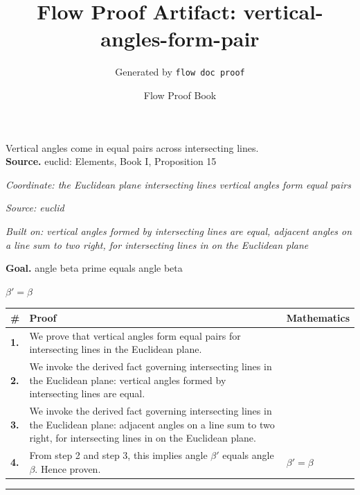 \documentclass[11pt]{article}
\title{Flow Proof Artifact: vertical-angles-form-pair}
\author{Generated by \texttt{flow doc proof}}
\date{Flow Proof Book}
\theoremstyle{definition}
\begin{document}
\maketitle
Vertical angles come in equal pairs across intersecting lines.\\[0.5em]
\textbf{Source.} euclid: Elements, Book I, Proposition 15\\[0.5em]
\bigskip
{}\par
\smallskip\noindent\textit{Coordinate: the Euclidean plane \cdot intersecting lines \cdot vertical angles form equal pairs}\par
\smallskip\noindent\textit{Source: euclid}\par
\smallskip\noindent\textit{Built on: vertical angles formed by intersecting lines are equal, adjacent angles on a line sum to two right, for intersecting lines in on the Euclidean plane}\par
\medskip
\noindent\textbf{Goal.} angle beta prime equals angle beta\par
\noindent$\displaystyle \beta' = \beta$\par
\medskip
\noindent
\begin{tabular}{@{} >{\raggedright\arraybackslash}p{} >{\raggedright\arraybackslash}p{} >{\raggedleft\arraybackslash}p{} @{}}
\textbf{\#} & \textbf{Proof} & \textbf{Mathematics} \\
\midrule
\textbf{1.} & We prove that vertical angles form equal pairs for intersecting lines in the Euclidean plane. & \\[0.45em]
\textbf{2.} & We invoke the derived fact governing intersecting lines in the Euclidean plane: vertical angles formed by intersecting lines are equal. & \\[0.45em]
\textbf{3.} & We invoke the derived fact governing intersecting lines in the Euclidean plane: adjacent angles on a line sum to two right, for intersecting lines in on the Euclidean plane. & \\[0.45em]
\textbf{4.} & From step 2 and step 3, this implies angle $\beta$$'$ equals angle $\beta$. Hence proven. & $\displaystyle \beta' = \beta$ \\[0.45em]
\bottomrule
\end{tabular}
\label{thm:Geometry-intersecting lines-vertical_angles_form_equal_pairs}
\par\medskip\hrule
\end{document}
